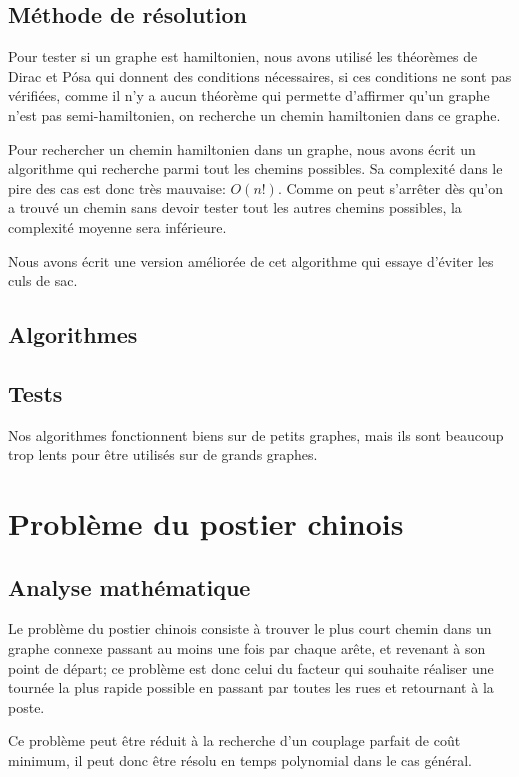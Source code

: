 \documentclass{scrartcl}
\begin{document}
  \subsection{Méthode de résolution}
    Pour tester si un graphe est hamiltonien, nous avons utilisé les théorèmes
    de Dirac et Pósa qui donnent des conditions nécessaires, si ces conditions
    ne sont pas vérifiées, comme il n'y a aucun théorème qui permette
    d'affirmer qu'un graphe n'est pas semi-hamiltonien, on recherche un chemin
    hamiltonien dans ce graphe.

    Pour rechercher un chemin hamiltonien dans un graphe, nous avons écrit un
    algorithme qui recherche parmi tout les chemins possibles. Sa complexité
    dans le pire des cas est donc très mauvaise: $O(n!)$. Comme on peut
    s'arrêter dès qu'on a trouvé un chemin sans devoir tester tout les autres
    chemins possibles, la complexité moyenne sera inférieure.

    Nous avons écrit une version améliorée de cet algorithme qui essaye
    d'éviter les culs de sac.

  \subsection{Algorithmes}
  \subsection{Tests}
    Nos algorithmes fonctionnent biens sur de petits graphes, mais ils sont
    beaucoup trop lents pour être utilisés sur de grands graphes.

\section{Problème du postier chinois}
  \subsection{Analyse mathématique}
    Le problème du postier chinois consiste à trouver le plus court chemin dans
    un graphe connexe passant au moins une fois par chaque arête, et revenant
    à son point de départ; ce problème est donc celui du facteur qui souhaite
    réaliser une tournée la plus rapide possible en passant par toutes les rues
    et retournant à la poste. 

    Ce problème peut être réduit à la recherche d'un couplage parfait de coût
    minimum, il peut donc être résolu en temps polynomial dans le cas général.
\end{document}
